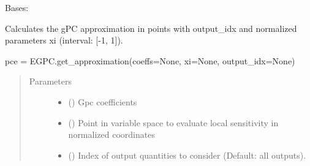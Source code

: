 \documentclass[letterpaper,10pt,english,openany,oneside]{sphinxmanual}
\begin{document}
\begin{fulllineitems}
\label{\detokenize{pygpc:pygpc.EGPC.EGPC}}
Bases: {\hyperref[\detokenize{pygpc:pygpc.GPC.GPC}]{}}

\begin{fulllineitems}
\label{\detokenize{pygpc:pygpc.EGPC.EGPC.get_approximation}}
Calculates the gPC approximation in points with output\_idx and normalized parameters xi (interval: {[}-1, 1{]}).

pce = EGPC.get\_approximation(coeffs=None, xi=None, output\_idx=None)
\begin{quote}\begin{description}
\item[{Parameters}] \leavevmode\begin{itemize}
\item {} 
 (\sphinxstyleliteralemphasis{\sphinxupquote{{[}}}\sphinxstyleliteralemphasis{\sphinxupquote{{]} }}\sphinxstyleliteralemphasis{\sphinxupquote{, }}\sphinxstyleliteralemphasis{\sphinxupquote{, }}) \textendash{} Gpc coefficients

\item {} 
 (\sphinxstyleliteralemphasis{\sphinxupquote{{[}}}\sphinxstyleliteralemphasis{\sphinxupquote{{]} }}\sphinxstyleliteralemphasis{\sphinxupquote{, }}\sphinxstyleliteralemphasis{\sphinxupquote{, }}) \textendash{} Point in variable space to evaluate local sensitivity in normalized coordinates

\item {} 
 (\sphinxstyleliteralemphasis{\sphinxupquote{{[}}}\sphinxstyleliteralemphasis{\sphinxupquote{{]} }}\sphinxstyleliteralemphasis{\sphinxupquote{, }}\sphinxstyleliteralemphasis{\sphinxupquote{, }}) \textendash{} Index of output quantities to consider (Default: all outputs).


\end{itemize}
\end{description}
\end{quote}
\end{fulllineitems}
\end{fulllineitems}
\end{document}
